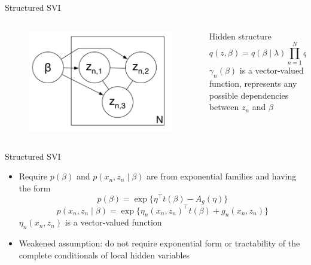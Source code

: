 \documentclass[aspectratio=169]{beamer}
\begin{document}
\begin{frame}{Structured SVI}
    \begin{columns}
    \begin{column}{0.48\textwidth}
        \begin{figure}
        \includegraphics[width=\textwidth]{structured_mf.png}\hspace*{12cm}
        \end{figure}
    \end{column}
    \begin{column}{0.48\textwidth}
        \begin{block}{Hidden structure}
        \[q(z, \beta) = q(\beta \mid \lambda) \prod\limits_{n=1}^N q(z_n \mid \gamma_n(\beta))\]
        $\gamma_n(\beta)$ is a vector-valued function, represents any possible dependencies between $z_n$ and $\beta$
        \end{block}
    \end{column}
    \end{columns}
\end{frame}

\begin{frame}{Structured SVI}
    \begin{itemize}
        \item Require $p(\beta)$ and $p(x_n, z_n \mid \beta)$ are from exponential families and having the form
        \[p(\beta) = \exp\{\eta^{\top} t(\beta) - A_g(\eta)\}\]
        \[p(x_n, z_n \mid \beta) = \exp\{\eta_n(x_n, z_n)^{\top}t(\beta) + g_n(x_n, z_n)\}\]
        $\eta_n(x_n, z_n)$ is a vector-valued function%
        \item Weakened assumption: do not require exponential form or tractability of the complete conditionals of local hidden variables
    \end{itemize}
\end{frame}
\end{document}
